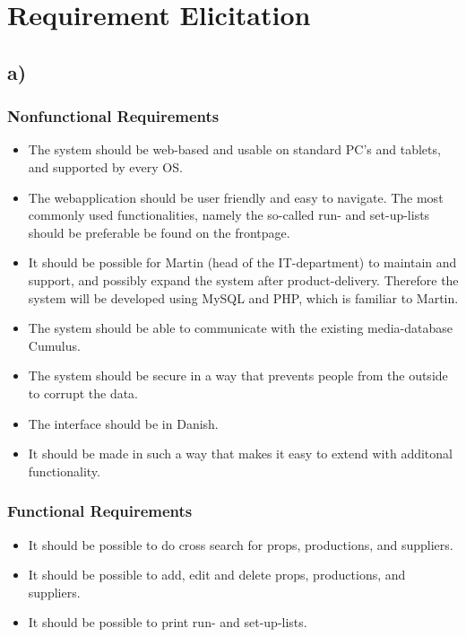\documentclass[12pt]{article}
\begin{document}
\section{Requirement Elicitation}
\subsection{a)}
\subsubsection{Nonfunctional Requirements}
\begin{itemize}
  \item The system should be web-based and usable on standard PC's and tablets, and supported by every OS.
  \item The webapplication should be user friendly and easy to navigate. The most commonly used functionalities, namely the so-called run- and set-up-lists should be preferable be found on the frontpage.
  \item It should be possible for Martin (head of the IT-department) to maintain and support, and possibly expand the system after product-delivery. Therefore the system will be developed using MySQL and PHP, which is familiar to Martin.
  \item The system should be able to communicate with the existing media-database Cumulus.
  \item The system should be secure in a way that prevents people from the outside to corrupt the data.
  \item The interface should be in Danish.
  \item It should be made in such a way that makes it easy to extend with additonal functionality.
\end{itemize}
\subsubsection{Functional Requirements}
\begin{itemize}
  \item It should be possible to do cross search for props, productions, and suppliers.
  \item It should be possible to add, edit and delete props, productions, and suppliers.
  \item It should be possible to print run- and set-up-lists.
\end{itemize}
\end{document}
